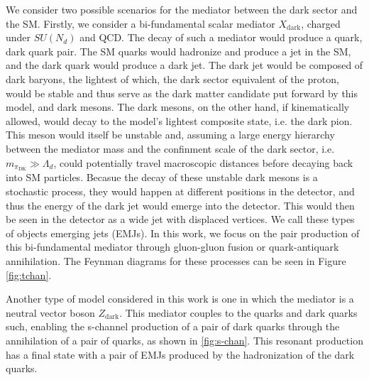 We consider two possible scenarios for the mediator between the dark sector and the SM. Firstly, we consider a bi-fundamental scalar mediator $X_{\text{dark}}$, charged under $SU(N_d)$ and QCD. The decay of such a mediator would produce a quark, dark quark pair. The SM quarks would hadronize and produce a jet in the SM, and the dark quark would produce a dark jet. The dark jet would be composed of dark baryons, the lightest of which, the dark sector equivalent of the proton, would be stable and thus serve as the dark matter candidate put forward by this model, and dark mesons. The dark mesons, on the other hand, if kinematically allowed, would decay to the model's lightest composite state, i.e. the dark pion. This meson would itself be unstable and, assuming a large energy hierarchy between the mediator mass and the confinment scale of the dark sector, i.e. $m_{\pi_{\text{DK}}} \gg \Lambda_d$, could potentially travel macroscopic distances before decaying back into SM particles. Becasue the decay of these unstable dark mesons is a stochastic process, they would happen at different positions in the detector, and thus the energy of the dark jet would emerge into the detector. This would then be seen in the detector as a wide jet with displaced vertices. We call these types of objects emerging jets (EMJs). In this work, we focus on the pair production of this bi-fundamental mediator through gluon-gluon fusion or quark-antiquark annihilation. The Feynman diagrams for these processes can be seen in Figure \ref{fig:tchan}.

Another type of model considered in this work is one in which the mediator is a neutral vector boson $Z_{\text{dark}}$. This mediator couples to the quarks and dark quarks such, enabling the s-channel production of a pair of dark quarks through the annihilation of a pair of quarks, as shown in \ref{fig:s-chan}. This resonant production has a final state with a pair of EMJs produced by the hadronization of the dark quarks.






